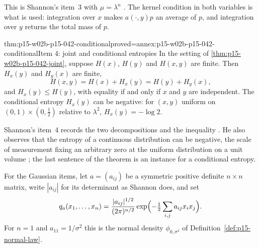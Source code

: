 This is Shannon's item~3 with \(\mu=\lambda^n\)
\cite[sec.~20, p.~36]{Shannon1948MathematicalTheory}. The kernel condition in both
variables is what is used: integration over \(x\) makes \(a(\cdot,y)p\) an
average of \(p\), and integration over \(y\) returns the total mass of \(p\).

\begin{hbtheorem}{thm:p15-w02b-p15-042-conditional}{proved=annex:p15-w02b-p15-042-conditional}{Item 4: joint and conditional entropies}
In the setting of \cref{thm:p15-w02b-p15-042-joint}, suppose \(H(x)\),
\(H(y)\) and \(H(x,y)\) are finite. Then \(H_x(y)\) and \(H_y(x)\) are finite,
\[
 H(x,y)=H(x)+H_x(y)=H(y)+H_y(x),
\]
and \(H_x(y)\leq H(y)\), with equality if and only if \(x\) and \(y\) are
independent. The conditional entropy \(H_x(y)\) can be negative: for \((x,y)\)
uniform on \((0,1)\times(0,\tfrac12)\) relative to \(\lambda^2\),
\(H_x(y)=-\log2\).
\end{hbtheorem}

Shannon's item~4 records the two decompositions and the inequality
\cite[sec.~20, p.~36]{Shannon1948MathematicalTheory}. He also observes that the
entropy of a continuous distribution can be negative, the scale of
measurement fixing an arbitrary zero at the uniform distribution on a unit
volume \cite[sec.~20, p.~38]{Shannon1948MathematicalTheory}; the last sentence of the
theorem is an instance for a conditional entropy.

For the Gaussian items, let \(a=(a_{ij})\) be a symmetric positive definite
\(n\times n\) matrix, write \(|a_{ij}|\) for its determinant as Shannon does,
and set
\[
 q_a(x_1,\ldots,x_n)=\frac{|a_{ij}|^{1/2}}{(2\pi)^{n/2}}
   \exp\Bigl(-\tfrac12\sum_{i,j}a_{ij}x_ix_j\Bigr).
\]
For \(n=1\) and \(a_{11}=1/\sigma^2\) this is the normal density
\(\phi_{0,\sigma^2}\) of Definition~\ref{def:p15-normal-law}.

